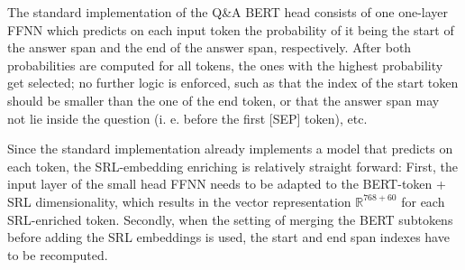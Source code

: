 
The standard implementation of the Q\&A BERT head consists of one one-layer FFNN which predicts
on each input token the probability of it being the start of the answer span and the end of the
answer span, respectively. After both probabilities are computed for all tokens, the ones with
the highest probability get selected; no further logic is enforced, such as that the index of
the start token should be smaller than the one of the end token, or that the answer span may
not lie inside the question (i. e. before the first [SEP] token), etc.

Since the standard implementation already implements a model that predicts on each token,
the SRL-embedding enriching is relatively straight forward:
First, the input layer of the small head FFNN needs to be adapted to the BERT-token + SRL
dimensionality, which results in the vector representation $\mathbb{R}^{768+60}$ for each
SRL-enriched token. Secondly, when the setting of merging the BERT subtokens before adding
the SRL embeddings is used, the start and end span indexes have to be recomputed.




